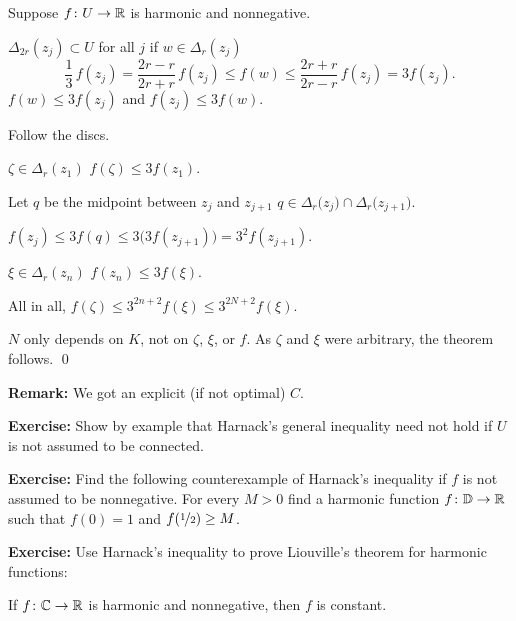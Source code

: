 \documentclass[10pt,aspectratio=169]{beamer}
\begin{document}
\begin{frame}
Suppose $f \colon U \to {\mathbb{R}}$ is harmonic and nonnegative.

\medskip
\pause

$\Delta_{2r}(z_j) \subset U$ for all $j$ \pause \wthus if $w \in \Delta_r(z_j)$
\pause
\quad \thus
\[
\frac{1}{3} \, f(z_j) = 
\frac{2r-r}{2r+r}\, f(z_j)
\leq
f(w)
\leq \frac{2r+r}{2r-r}\, f(z_j)
= 3 f(z_j) .
\]
\pause
\thus\quad $f(w) \leq 3 f(z_j)$ and $f(z_j) \leq 3 f(w)$.

\pause
\medskip

Follow the discs.

\medskip
\pause

$\zeta \in \Delta_r(z_1)$ \wthus
$f(\zeta) \leq 3 f(z_1)$.

\pause
\medskip

Let 
$q$ be the midpoint between $z_{j}$ and $z_{j+1}$
\wthus
$q \in \Delta_{r}\bigl(z_{j}\bigr) \cap \Delta_{r}\bigl(z_{j+1}\bigr)$.

\pause
\medskip
\thus
\quad
$f(z_j) \leq 3 f(q) \leq 3 \bigl( 3 f(z_{j+1}) \bigr) = 3^2 f(z_{j+1})$.

\pause
\medskip

$\xi \in \Delta_r(z_n)$ \wthus
$f(z_n) \leq 3 f(\xi)$.

\pause
\medskip

All in all, \quad
$f(\zeta) \leq
3^{2n+2}
f(\xi)
\leq
3^{2N+2}
f(\xi)$.

\pause
\medskip

$N$ only depends on $K$, not on $\zeta$, $\xi$, or $f$.
As $\zeta$ and $\xi$ were arbitrary, the theorem follows. \qed

\medskip
\pause

\textbf{Remark:} We got an explicit (if not optimal) $C$.
\end{frame}

\begin{frame}
\textbf{Exercise:}
Show by example that Harnack's general inequality need not hold if $U$
is not assumed to be connected.

\medskip
\pause

\textbf{Exercise:}
Find the following counterexample of Harnack's inequality
if $f$ is not assumed to be
nonnegative.  For every $M > 0$ find
a harmonic function $f \colon {\mathbb{D}} \to {\mathbb{R}}$ such that $f(0) = 1$ and
$f(\nicefrac{1}{2}) \geq M$.

\medskip
\pause

\textbf{Exercise:}
Use Harnack's inequality to prove Liouville's theorem
for harmonic functions:

If $f \colon {\mathbb{C}} \to {\mathbb{R}}$ is harmonic
and nonnegative, then $f$ is constant.
\end{frame}
\end{document}
